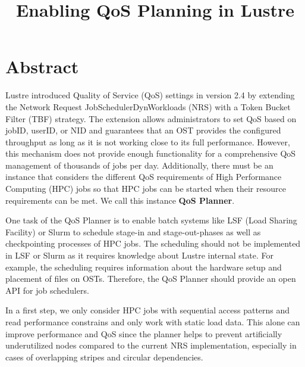 \documentclass[10pt]{article}
\title{Enabling QoS Planning in Lustre}
\begin{document}
\maketitle

\section{Abstract}

Lustre introduced Quality of Service (QoS) settings in version 2.4 by extending the Network Request JobSchedulerDynWorkloads (NRS) with a Token Bucket Filter (TBF) strategy.
The extension allows administrators to set QoS based on jobID, userID, or NID and guarantees that an OST provides the configured throughput as long as it is not working close to its full performance.
However, this mechanism does not provide enough functionality for a comprehensive QoS management of thousands of jobs per day.
Additionally, there must be an instance that considers the different QoS requirements of High Performance Computing (HPC) jobs so that HPC jobs can be started when their resource requirements can be met.
We call this instance \textbf{QoS Planner}.

One task of the QoS Planner is to enable batch systems like LSF (Load Sharing Facility) or Slurm to schedule stage-in and stage-out-phases as well as checkpointing processes of HPC jobs.
The scheduling should not be implemented in LSF or Slurm as it requires knowledge about Lustre internal state.
For example, the scheduling requires information about the hardware setup and placement of files on OSTs.
Therefore, the QoS Planner should provide an open API for job schedulers.

In a first step, we only consider HPC jobs with sequential access patterns and read performance constrains and only work with static load data.
This alone can improve performance and QoS since the planner helps to prevent artificially underutilized nodes compared to the current NRS implementation, especially in cases of overlapping stripes and circular dependencies.

\end{document}
